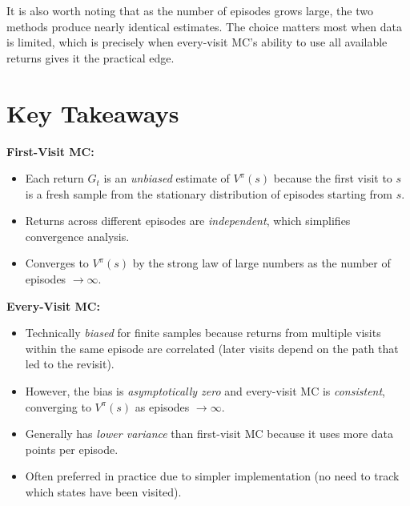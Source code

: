 \documentclass[journal, onecolumn]{IEEEtran}
\begin{document}
It is also worth noting that as the number of episodes grows large, the two methods produce nearly identical estimates. The choice matters most when data is limited, which is precisely when every-visit MC's ability to use all available returns gives it the practical edge.

\section{Key Takeaways}

\begin{tcolorbox}[memorybox={Bias and Variance Properties}]
\textbf{First-Visit MC:}
\begin{itemize}[leftmargin=1.5em, itemsep=2pt]
    \item Each return $G_t$ is an \textit{unbiased} estimate of $V^\pi(s)$ because the first visit to $s$ is a fresh sample from the stationary distribution of episodes starting from $s$.
    \item Returns across different episodes are \textit{independent}, which simplifies convergence analysis.
    \item Converges to $V^\pi(s)$ by the strong law of large numbers as the number of episodes $\to \infty$.
\end{itemize}

\medskip

\textbf{Every-Visit MC:}
\begin{itemize}[leftmargin=1.5em, itemsep=2pt]
    \item Technically \textit{biased} for finite samples because returns from multiple visits within the same episode are correlated (later visits depend on the path that led to the revisit).
    \item However, the bias is \textit{asymptotically zero} and every-visit MC is \textit{consistent}, converging to $V^\pi(s)$ as episodes $\to \infty$.
    \item Generally has \textit{lower variance} than first-visit MC because it uses more data points per episode.
    \item Often preferred in practice due to simpler implementation (no need to track which states have been visited).
\end{itemize}
\end{tcolorbox}
\end{document}
